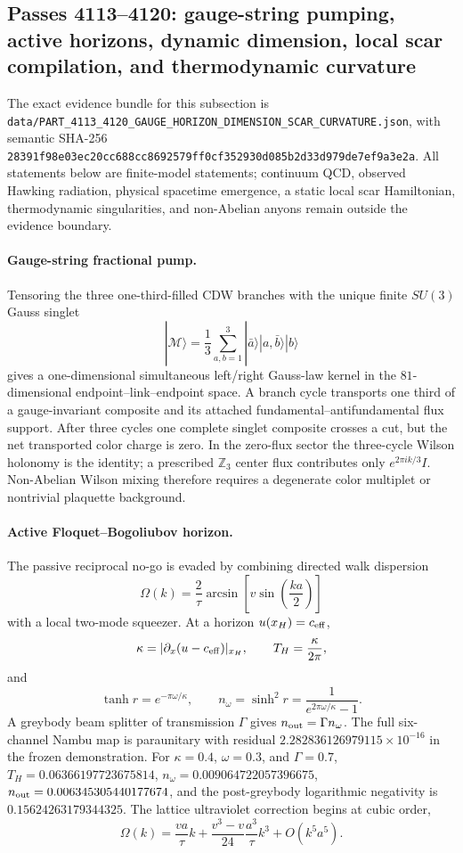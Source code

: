 \subsection{Passes 4113--4120: gauge-string pumping, active horizons, dynamic dimension, local scar compilation, and thermodynamic curvature}
\label{sec:passes4113-4120}

The exact evidence bundle for this subsection is
\texttt{data/PART\_4113\_4120\_GAUGE\_HORIZON\_DIMENSION\_SCAR\_CURVATURE.json},
with semantic SHA-256
\texttt{28391f98e03ec20cc688cc8692579ff0cf352930d085b2d33d979de7ef9a3e2a}.
All statements below are finite-model statements; continuum QCD, observed Hawking radiation,
physical spacetime emergence, a static local scar Hamiltonian, thermodynamic singularities,
and non-Abelian anyons remain outside the evidence boundary.

\paragraph{Gauge-string fractional pump.}
Tensoring the three one-third-filled CDW branches with the unique finite $SU(3)$ Gauss singlet
\[
 |\mathcal M\rangle=\frac13\sum_{a,b=1}^{3}|\bar a\rangle|a,\bar b\rangle|b\rangle
\]
gives a one-dimensional simultaneous left/right Gauss-law kernel in the $81$-dimensional endpoint--link--endpoint space.
A branch cycle transports one third of a gauge-invariant composite and its attached fundamental--antifundamental flux support.
After three cycles one complete singlet composite crosses a cut, but the net transported color charge is zero.
In the zero-flux sector the three-cycle Wilson holonomy is the identity; a prescribed $\mathbb Z_3$ center flux contributes only
$e^{2\pi i k/3}I$.  Non-Abelian Wilson mixing therefore requires a degenerate color multiplet or nontrivial plaquette background.

\paragraph{Active Floquet--Bogoliubov horizon.}
The passive reciprocal no-go is evaded by combining directed walk dispersion
\[
 \Omega(k)=\frac{2}{\tau}\arcsin\!\left[v\sin\left(\frac{ka}{2}\right)\right]
\]
with a local two-mode squeezer.  At a horizon $u(x_H)=c_{\rm eff}$,
\[
 \kappa=|\partial_x(u-c_{\rm eff})|_{x_H},\qquad T_H=\frac{\kappa}{2\pi},
\]
and
\[
 \tanh r=e^{-\pi\omega/\kappa},\qquad
 n_\omega=\sinh^2r=\frac{1}{e^{2\pi\omega/\kappa}-1}.
\]
A greybody beam splitter of transmission $\Gamma$ gives $n_{\rm out}=\Gamma n_\omega$.
The full six-channel Nambu map is paraunitary with residual
$2.282836126979115\times10^{-16}$ in the frozen demonstration.
For $\kappa=0.4$, $\omega=0.3$, and $\Gamma=0.7$,
$T_H=0.06366197723675814$, $n_\omega=0.009064722057396675$,
$n_{\rm out}=0.006345305440177674$, and the post-greybody logarithmic negativity is
$0.15624263179344325$.
The lattice ultraviolet correction begins at cubic order,
\[
 \Omega(k)=\frac{va}{\tau}k+\frac{v^3-v}{24}\frac{a^3}{\tau}k^3+O(k^5a^5).
\]

